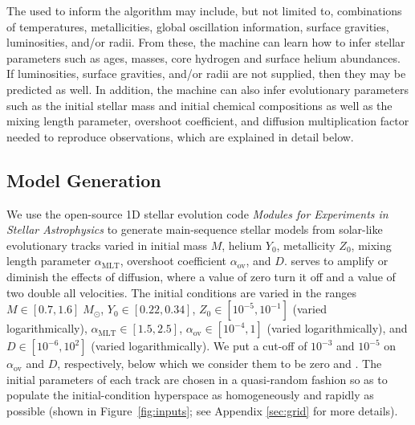 The  used to inform the algorithm may include, but  not limited to, combinations of temperatures, metallicities, global oscillation information, surface gravities, luminosities, and/or radii. From these, the machine can learn how to infer stellar parameters such as ages, masses, core hydrogen and surface helium abundances. If luminosities, surface gravities, and/or radii are not supplied, then they may be predicted as well. In addition, the machine can also infer evolutionary parameters such as the initial stellar mass and initial chemical compositions as well as the mixing length parameter, overshoot coefficient, and diffusion multiplication factor needed to reproduce observations, which are explained in detail below. 

\subsection{Model Generation}
\label{sec:models}
We use the open-source 1D stellar evolution code \emph{Modules for Experiments in Stellar Astrophysics} \citep[MESA;][]{2011apjs..192....3p} to generate main-sequence stellar models from solar-like evolutionary tracks varied in initial mass $M$, helium $Y_0$, metallicity $Z_0$, mixing length parameter $\alpha_{\text{MLT}}$, overshoot coefficient $\alpha_{\text{ov}}$, and  $D$.  serves to amplify or diminish the effects of diffusion, where a value of zero turn it off and a value of two double all velocities. The initial conditions are varied in the ranges ${M\in [0.7, 1.6]\;M_\odot}$, ${Y_0\in [0.22, 0.34]}$, ${Z_0\in [10^{-5}, 10^{-1}]}$ (varied logarithmically), ${\alpha_{\text{MLT}}\in [1.5, 2.5]}$, ${\alpha_{\text{ov}}\in [10^{-4}, 1]}$ (varied logarithmically), and ${D\in [10^{-6}, 10^2]}$ (varied logarithmically). We put a cut-off of $10^{-3}$ and $10^{-5}$ on $\alpha_{\text{ov}}$ and $D$, respectively, below which we consider them to be zero and . The initial parameters of each track are chosen in a quasi-random fashion so as to populate the initial-condition hyperspace as homogeneously and rapidly as possible (shown in Figure~\ref{fig:inputs}; see Appendix \ref{sec:grid} for more details). 

